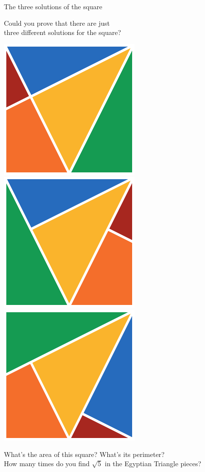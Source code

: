 \documentclass[14pt]{beamer}
\begin{document}
    \begin{frame}{The three solutions of the square}

        \vspace{-1em}
        \begin{center}
            Could you prove that there are just\\three different solutions for the square?

            \bigskip\bigskip

            \includegraphics[height=12ex]{figures/figure021a.pdf}\quad\includegraphics[height=12ex]{figures/figure021b.pdf}\quad\includegraphics[height=12ex]{figures/figure021c.pdf} \\

            \bigskip\bigskip

            {\footnotesize What's the area of this square? What's its perimeter?\\How many times do you find $\sqrt{5}$ in the Egyptian Triangle pieces?}
        \end{center}
    \end{frame}

\end{document}
